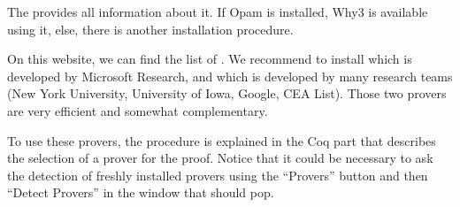 The  provides all information
about it. If Opam is installed, Why3 is available using it, else, there
is another installation procedure.



On this website, we can find the list of
.
We recommend to install
 which is
developed by Microsoft Research, and
 which is developed by many
research teams (New York University, University of Iowa, Google, CEA
List). Those two provers are very efficient and somewhat complementary.



To use these provers, the procedure is explained in the Coq part that
describes the selection of a prover for the proof. Notice that it could
be necessary to ask the detection of freshly installed provers using the
``Provers'' button and then ``Detect Provers'' in the window that should
pop.
